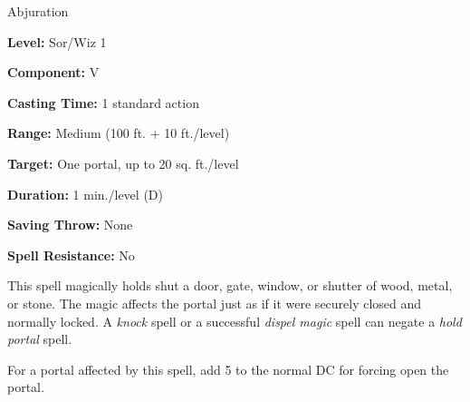 
Abjuration

\textbf{Level:} Sor/Wiz 1

\textbf{Component:} V

\textbf{Casting Time:} 1 standard action

\textbf{Range:} Medium (100 ft. + 10 ft./level)

\textbf{Target:} One portal, up to 20 sq. ft./level

\textbf{Duration:} 1 min./level (D)

\textbf{Saving Throw:} None

\textbf{Spell Resistance:} No

This spell magically holds shut a door, gate, window, or shutter of wood, metal, 
or stone. The magic affects the portal just as if it were securely closed and normally 
locked. A \textit{knock} spell or a successful \textit{dispel magic} spell can 
negate a \textit{hold portal} spell.

For a portal affected by this spell, add 5 to the normal DC for forcing open the 
portal.

